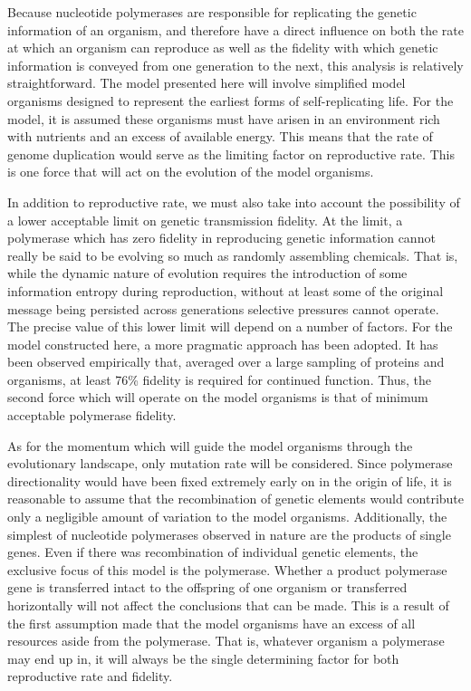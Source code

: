 Because nucleotide polymerases are responsible for replicating the genetic information of an organism, and therefore have a direct influence on both the rate at which an organism can reproduce as well as the fidelity with which genetic information is conveyed from one generation to the next, this analysis is relatively straightforward. The model presented here will involve simplified model organisms designed to represent the earliest forms of self-replicating life. For the model, it is assumed these organisms must have arisen in an environment rich with nutrients and an excess of available energy. This means that the rate of genome duplication would serve as the limiting factor on reproductive rate. This is one force that will act on the evolution of the model organisms.

In addition to reproductive rate, we must also take into account the possibility of a lower acceptable limit on genetic transmission fidelity. At the limit, a polymerase which has zero fidelity in reproducing genetic information cannot really be said to be evolving so much as randomly assembling chemicals. That is, while the dynamic nature of evolution requires the introduction of some information entropy during reproduction, without at least some of the original message being persisted across generations selective pressures cannot operate. The precise value of this lower limit will depend on a number of factors. For the model constructed here, a more pragmatic approach has been adopted. It has been observed empirically that, averaged over a large sampling of proteins and organisms, at least 76\% fidelity is required for continued function. Thus, the second force which will operate on the model organisms is that of minimum acceptable polymerase fidelity.

As for the momentum which will guide the model organisms through the evolutionary landscape, only mutation rate will be considered. Since polymerase directionality would have been fixed extremely early on in the origin of life, it is reasonable to assume that the recombination of genetic elements would contribute only a negligible amount of variation to the model organisms. Additionally, the simplest of nucleotide polymerases observed in nature are the products of single genes. Even if there was recombination of individual genetic elements, the exclusive focus of this model is the polymerase. Whether a product polymerase gene is transferred intact to the offspring of one organism or transferred horizontally will not affect the conclusions that can be made. This is a result of the first assumption made that the model organisms have an excess of all resources aside from the polymerase. That is, whatever organism a polymerase may end up in, it will always be the single determining factor for both reproductive rate and fidelity.
